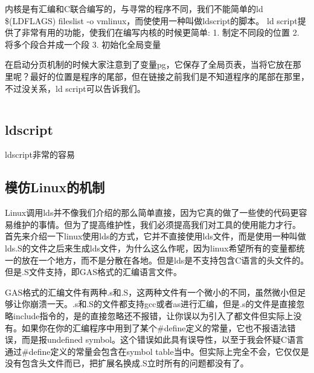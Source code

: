内核是有汇编和C联合编写的，与寻常的程序不同，我们不能简单的ld \$(LDFLAGS) fileslist -o vmlinux，而使使用一种叫做ldscript的脚本。 ld script提供了非常有用的功能，使我们在编写内核的时候更简单:
1. 制定不同段的位置
2. 将多个段合并成一个段
3. 初始化全局变量

在启动分页机制的时候大家注意到了变量pg，它保存了全局页表，当将它放在那里呢？最好的位置是程序的尾部，但在链接之前我们是不知道程序的尾部在那里，不过没关系，ld script可以告诉我们。
\begin{lstlisting}[language=bash]


\end{lstlisting}


\subsection{ldscript}
ldscript非常的容易

\subsection{模仿Linux的机制}
Linux调用lds并不像我们介绍的那么简单直接，因为它真的做了一些使的代码更容易维护的事情。但为了提高维护性，我们必须提高我们对工具的使用能力才行。
首先来介绍一下linux使用lds的方式，它并不直接使用lds文件，而是使用一种叫做lds.S的文件之后来生成lds文件，为什么这么作呢，因为linux希望所有的变量都统一的放在一个地方，而不是分散在各地。但是lds是不支持包含C语言的头文件的。但是.S文件支持，即GAS格式的汇编语言文件。

GAS格式的汇编文件有两种.s和.S，这两种文件有一个微小的不同，虽然微小但足够让你崩溃一天。.s和.S的文件都支持gcc或者as进行汇编，但是.s的文件是直接忽略include指令的，是的直接忽略还不报错，让你误以为引入了都文件但实际上没有。如果你在你的汇编程序中用到了某个\#define定义的常量，它也不报语法错误，而是报undefined symbol。这个错误如此具有误导性，以至于我会怀疑C语言通过\#define定义的常量会包含在symbol table当中。但实际上完全不会，它仅仅是没有包含头文件而已，把扩展名换成.S立时所有的问题都没有了。


